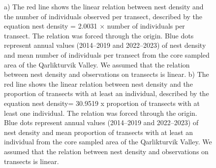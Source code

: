 \documentclass[a4paper,twoside,12pt]{article}
\begin{document}
\begin{enumerate}[label=\alph*.]
\begin{figure}[H]
\begin{subfigure}{0.5\textwidth}
                \caption{}
                \end{subfigure}
                \caption{a) The red line shows the linear relation between nest density and the number of individuals observed per transect, described by the equation nest density = 2.0031 × number of individuals per transect. The relation was forced through the origin. Blue dots represent annual values (2014–2019 and 2022–2023) of nest density and mean number of individuals per transect from the core sampled area of the Qarlikturvik Valley. We assumed that the relation between nest density and observations on transects is linear. b) The red line shows the linear relation between nest density and the proportion of transects with at least an individual, described by the equation nest density= 30.9519 x proportion of transects with at least one individual. The relation was forced through the origin. Blue dots represent annual values (2014–2019 and 2022–2023) of nest density and mean proportion of transects with at least an individual from the core sampled area of the Qarlikturvik Valley. We assumed that the relation between nest density and observations on transects is linear.}
                \label{figure:lalo_basa}
                \end{figure} 
                

\end{enumerate}
\end{document}
